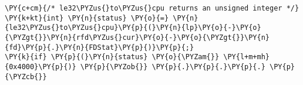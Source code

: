 \begin{Verbatim}[commandchars=\\\{\},codes={\catcode`\$=3\catcode`\^=7\catcode`\_=8}]
\PY{c+cm}{/* le32\PYZus{}to\PYZus{}cpu returns an unsigned integer */}
\PY{k+kt}{int} \PY{n}{status} \PY{o}{=} \PY{n}{le32\PYZus{}to\PYZus{}cpu}\PY{p}{(}\PY{n}{lp}\PY{o}{-}\PY{o}{\PYZgt{}}\PY{n}{rfd\PYZus{}cur}\PY{o}{-}\PY{o}{\PYZgt{}}\PY{n}{fd}\PY{p}{.}\PY{n}{FDStat}\PY{p}{)}\PY{p}{;}
\PY{k}{if} \PY{p}{(}\PY{n}{status} \PY{o}{\PYZam{}} \PY{l+m+mh}{0x4000}\PY{p}{)} \PY{p}{\PYZob{}} \PY{p}{.}\PY{p}{.}\PY{p}{.} \PY{p}{\PYZcb{}}
\end{Verbatim}
